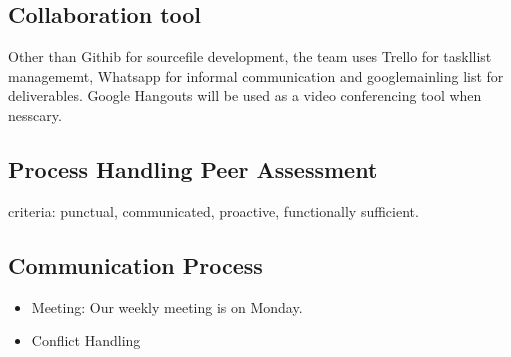 \documentclass[11pt]{article}
\begin{document}
\subsection{Collaboration tool}

Other than Githib for sourcefile development, the team uses Trello for taskllist managememt, Whatsapp for informal communication and googlemainling list for deliverables. Google Hangouts will be used as a video conferencing tool when nesscary.

\subsection{Process Handling Peer Assessment}
criteria: punctual, communicated, proactive, functionally sufficient. 
\subsection{Communication Process}
\begin{itemize}
	\item Meeting: Our weekly meeting is on Monday.
	\item Conflict Handling
\end{itemize}
\end{document}
